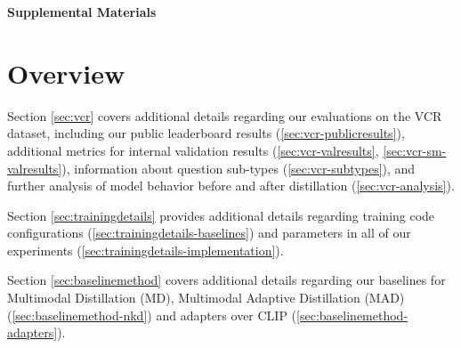 \documentclass[runningheads]{llncs}
\begin{document}
\clearpage



\clearpage


\newcommand{\beginsupplement}{\setcounter{table}{0}
        \renewcommand{\thetable}{S\arabic{table}}\setcounter{figure}{0}
        \renewcommand{\thefigure}{S\arabic{figure}}}

\renewcommand{\thesubsection}{\thesection.\alph{subsection}}
\renewcommand{\thesubsubsection}{\thesubsection.\arabic{subsection}}


\beginsupplement

\begin{center}
\textbf{\large Supplemental Materials}
\end{center}


\section{Overview}



 Section \ref{sec:vcr} covers additional details regarding our evaluations on the VCR dataset, including our public leaderboard results (\ref{sec:vcr-publicresults}), additional metrics for internal validation results (\ref{sec:vcr-valresults}, \ref{sec:vcr-sm-valresults}), information about question sub-types (\ref{sec:vcr-subtypes}), and further analysis of model behavior before and after distillation (\ref{sec:vcr-analysis}).

Section \ref{sec:trainingdetails} provides additional details regarding training code configurations (\ref{sec:trainingdetails-baselines}) and parameters in all of our experiments (\ref{sec:trainingdetails-implementation}).

Section \ref{sec:baselinemethod} covers additional details regarding our baselines for Multimodal Distillation (MD), Multimodal Adaptive Distillation (MAD) (\ref{sec:baselinemethod-nkd}) and adapters over CLIP (\ref{sec:baselinemethod-adapters}).
\end{document}
